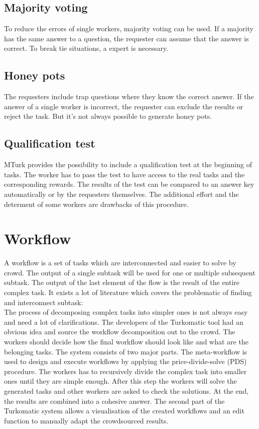 \subsection{Majority voting }
To reduce the errors of single workers, majority voting can be used. If a majority has the same answer to a question, the requester can assume that the answer is correct. To break tie situations, a expert is necessary. 
\subsection{Honey pots }
The requesters include trap questions where they know the correct answer. If the answer of a single worker is incorrect, the requester can exclude the results or reject the task. But it's not always possible to generate honey pots. 
\subsection{Qualification test }
MTurk provides the possibility to include a qualification test at the beginning of tasks. The worker has to pass the test to have access to the real tasks and the corresponding rewards. The results of the test can be compared to an answer key automatically or by the requesters themselves. The additional effort and the determent of some workers are drawbacks of this procedure.

\section{Workflow}
A workflow is a set of tasks which are interconnected and easier to solve by crowd. The output of a single subtask will be used for one or multiple subsequent subtask. The output of the last element of the flow is the result of the entire complex task. It exists a lot of literature which covers the problematic of finding and interconnect subtask:\\

The process of decomposing complex tasks into simpler ones is not always easy and need a lot of clarifications. The developers of the Turkomatic\cite{turkomatic} tool had an obvious idea and source the workflow decomposition out to the crowd. The workers should decide how the final workflow should look like and what are the belonging tasks. The system consists of two major parts. The meta-workflow is used to design and execute workflows by applying the price-divide-solve (PDS) procedure. The workers has to recursively divide the complex task into smaller ones until they are simple enough. After this step the workers will solve the generated tasks and other workers are asked to check the solutions. At the end, the results are combined into a cohesive answer. The second part of the Turkomatic system allows a visualisation of the created workflows and an edit function to manually adapt the crowdsourced results.\\

